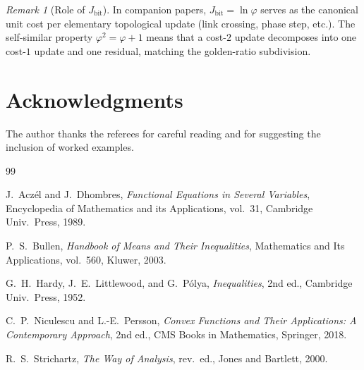 \documentclass[11pt]{amsart}
\theoremstyle{definition}
\theoremstyle{remark}
\newtheorem{remark}[theorem]{Remark}
\begin{document}
\begin{remark}[Role of $J_{\mathrm{bit}}$]
In companion papers, $J_{\mathrm{bit}}=\ln\varphi$ serves as the
canonical unit cost per elementary topological update
(link crossing, phase step, etc.).
The self-similar property $\varphi^2=\varphi+1$ means that a cost-$2$
update decomposes into one cost-$1$ update and one residual, matching
the golden-ratio subdivision.
\end{remark}

\section*{Acknowledgments}
The author thanks the referees for careful reading and for suggesting
the inclusion of worked examples.

\begin{thebibliography}{99}

J.~Acz\'el and J.~Dhombres,
\emph{Functional Equations in Several Variables},
Encyclopedia of Mathematics and its Applications, vol.~31,
Cambridge Univ.\ Press, 1989.

P.~S.~Bullen,
\emph{Handbook of Means and Their Inequalities},
Mathematics and Its Applications, vol.~560, Kluwer, 2003.

G.~H.~Hardy, J.~E.~Littlewood, and G.~P\'olya,
\emph{Inequalities}, 2nd ed.,
Cambridge Univ.\ Press, 1952.

C.~P.~Niculescu and L.-E.~Persson,
\emph{Convex Functions and Their Applications: A Contemporary Approach},
2nd ed., CMS Books in Mathematics, Springer, 2018.

R.~S.~Strichartz,
\emph{The Way of Analysis}, rev.\ ed.,
Jones and Bartlett, 2000.

\end{thebibliography}
\end{document}
